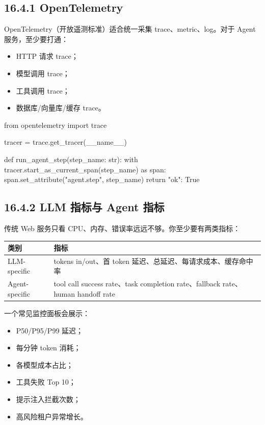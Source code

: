 \subsection{16.4.1 OpenTelemetry}

OpenTelemetry（开放遥测标准）适合统一采集 trace、metric、log。对于 Agent 服务，至少要打通：


\begin{itemize}[leftmargin=2em]
\item HTTP 请求 trace；
\item 模型调用 trace；
\item 工具调用 trace；
\item 数据库/向量库/缓存 trace。
\end{itemize}

\begin{codeblock}
from opentelemetry import trace

tracer = trace.get_tracer(__name__)

def run_agent_step(step_name: str):
    with tracer.start_as_current_span(step_name) as span:
        span.set_attribute("agent.step", step_name)
        return {"ok": True}
\end{codeblock}

\subsection{16.4.2 LLM 指标与 Agent 指标}

传统 Web 服务只看 CPU、内存、错误率远远不够。你至少要有两类指标：


\begingroup
\scriptsize
\setlength{\tabcolsep}{3pt}
\begin{longtable}{|p{}|p{}|}
\hline
类别 & 指标 \\ \hline
LLM-specific & tokens in/out、首 token 延迟、总延迟、每请求成本、缓存命中率 \\ \hline
Agent-specific & tool call success rate、task completion rate、fallback rate、human handoff rate \\ \hline
\end{longtable}
\endgroup

一个常见监控面板会展示：


\begin{itemize}[leftmargin=2em]
\item P50/P95/P99 延迟；
\item 每分钟 token 消耗；
\item 各模型成本占比；
\item 工具失败 Top 10；
\item 提示注入拦截次数；
\item 高风险租户异常增长。
\end{itemize}


